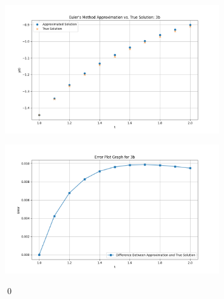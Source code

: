 \documentclass[11pt]{article}
\theoremstyle{break}
\numberwithin{equation}{theorem}
\begin{document}
\begin{enumerate}
    \begin{center}
        \includegraphics[width=0.7\textwidth]{P3b.png}
    \end{center}
    \begin{center}
        \includegraphics[width=0.7\textwidth]{P3be.png}
    \end{center} \qed
\end{enumerate}
\end{document}
